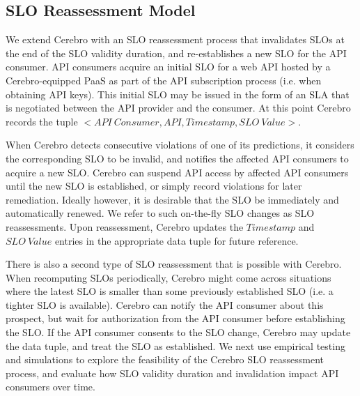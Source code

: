 \subsection{SLO Reassessment Model}
We extend Cerebro with an SLO reassessment process that invalidates SLOs at the end of the
SLO validity duration, and re-establishes a new SLO for the API consumer.
API consumers acquire an initial SLO for a web API 
hosted by a Cerebro-equipped PaaS
as part of the API subscription process (i.e. when obtaining API keys). This initial SLO
may be issued in the form of an SLA that is negotiated between the API provider and
the consumer.
At this point Cerebro records the 
tuple $<API\ Consumer, API, Timestamp, SLO\ Value>$.

When Cerebro detects consecutive violations of one of its predictions,
it considers the corresponding SLO to be invalid, 
and notifies the affected API consumers to acquire a 
new SLO. Cerebro can suspend API access by affected API consumers until 
the new SLO is established, or simply record violations for later remediation.
Ideally however, it is desirable that the SLO be immediately and automatically 
renewed. We refer to such on-the-fly
SLO changes as SLO reassessments. Upon reassessment, 
Cerebro updates the $Timestamp$ and $SLO\ Value$ entries
in the appropriate data tuple for future reference.

There is also a second type of SLO reassessment that is possible with Cerebro.
When recomputing SLOs periodically, Cerebro might come across situations where the latest SLO is smaller
than some previously established SLO (i.e. a tighter SLO is available). Cerebro can notify the 
API consumer about this prospect, but wait for authorization from the API consumer before 
establishing the SLO. If the API consumer consents to the SLO change, Cerebro may update the
data tuple, and treat the SLO as established.
We next use empirical testing and simulations to explore 
the feasibility of the Cerebro SLO reassessment process, and 
evaluate how SLO validity duration and invalidation impact API consumers over time.
